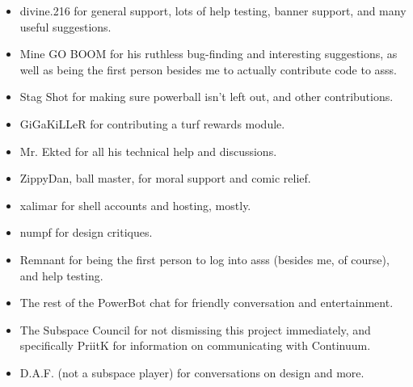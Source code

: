 \documentclass{article}
\newcommand{\asss}{asss}
\begin{document}
\begin{itemize}

\item{divine.216} for general support, lots of help testing, banner
support, and many useful suggestions.

\item{Mine GO BOOM} for his ruthless bug-finding and interesting
suggestions, as well as being the first person besides me to actually
contribute code to \asss{}.

\item{Stag Shot} for making sure powerball isn't left out, and other
contributions.

\item{GiGaKiLLeR} for contributing a turf rewards module.

\item{Mr. Ekted} for all his technical help and discussions.

\item{ZippyDan}, ball master, for moral support and comic relief.

\item{xalimar} for shell accounts and hosting, mostly.

\item{numpf} for design critiques. %

\item{Remnant} for being the first person to log into \asss{} (besides
me, of course), and help testing.

\item{The rest of the PowerBot chat} for friendly conversation and
entertainment.

\item{The Subspace Council} for not dismissing this project immediately,
and specifically PriitK for information on communicating with Continuum.


\item{D.A.F. (not a subspace player)} for conversations on design and
more.

\end{itemize}
\end{document}

